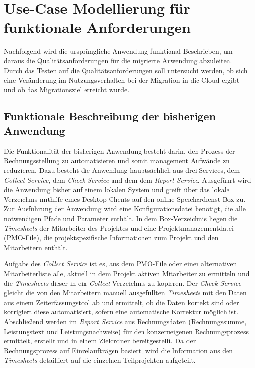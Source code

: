 \section{Use-Case Modellierung für funktionale Anforderungen}
\label{sec:use-case-modellierung}

Nachfolgend wird die ursprüngliche Anwendung funktional Beschrieben, um daraus die Qualitätsanforderungen für die migrierte Anwendung abzuleiten. Durch das Testen auf die Qualitätsanforderungen soll untersucht werden, ob sich eine Veränderung im Nutzungsverhalten bei der Migration in die Cloud ergibt und ob das Migrationsziel erreicht wurde.

\subsection{Funktionale Beschreibung der bisherigen Anwendung}
Die Funktionalität der bisherigen Anwendung besteht darin, den Prozess der Rechnungsstellung zu automatisieren und somit management Aufwände zu reduzieren. Dazu besteht die Anwendung hauptsächlich aus drei Services, dem \textit{Collect Service}, dem \textit{Check Service} und dem dem \textit{Report Service}. Ausgeführt wird die Anwendung bisher auf einem lokalen System und greift über das lokale Verzeichnis mithilfe eines Desktop-Clients auf den online Speicherdienst \gls{Box} zu. Zur Ausführung der Anwendung wird eine Konfigurationsdatei benötigt, die alle notwendigen Pfade und Parameter enthält. In dem \gls{Box}-Verzeichnis liegen die \textit{\glspl{Timesheet}} der Mitarbeiter des Projektes und eine Projektmanagementdatei (PMO-File), die projektspezifische Informationen zum Projekt und den Mitarbeitern enthält.

Aufgabe des \textit{Collect Service} ist es, aus dem PMO-File oder einer alternativen Mitarbeiterliste alle, aktuell in dem Projekt aktiven Mitarbeiter zu ermitteln und die \textit{\glspl{Timesheet}} dieser in ein \textit{Collect}-Verzeichnis zu kopieren. Der \textit{Check Service} gleicht die von den Mitarbeitern manuell ausgefüllten \textit{\glspl{Timesheet}} mit den Daten aus einem Zeiterfassungstool ab und ermittelt, ob die Daten korrekt sind oder korrigiert diese automatisiert, sofern eine automatische Korrektur möglich ist. Abschließend werden im \textit{Report Service} aus Rechnungsdaten (Rechnungssumme, Leistungstext und Leistungsnachweise) für den konzerneigenen Rechnungsprozess ermittelt, erstellt und in einem Zielordner bereitgestellt. Da der Rechnungsprozess auf Einzelaufträgen basiert, wird die Information aus den \textit{\glspl{Timesheet}} detailliert auf die einzelnen Teilprojekten aufgeteilt.

